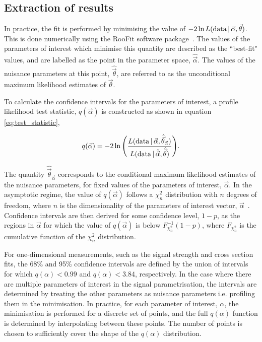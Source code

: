 \subsection{Extraction of results}\label{sec:results_extraction}
In practice, the fit is performed by minimising the value of $-2 \ln L({\rm{data}}\,|\,\vec{\alpha},\vec{\theta})$. This is done numerically using the RooFit software package~\cite{Verkerke:2003ir}. The values of the parameters of interest which minimise this quantity are described as the ``best-fit" values, and are labelled as the point in the parameter space, $\hat{\vec{\alpha}}$. The values of the nuisance parameters at this point, $\hat{\vec{\theta}}$, are referred to as the unconditional maximum likelihood estimates of $\vec{\theta}$. 

To calculate the confidence intervals for the parameters of interest, a profile likelihood test statistic, $q(\vec{\alpha})$ is constructed as shown in equation \ref{eq:test_statistic},

\begin{equation}\label{eq:test_statistic}
    q(\vec{\alpha}) = -2 \ln \Bigg( \frac{L({\rm{data}}\,|\,\vec{\alpha},\hat{\vec{\theta}}_{\vec{\alpha}})}{L({\rm{data}}\,|\,\hat{\vec{\alpha}},\hat{\vec{\theta}})} \Bigg).
\end{equation}

\noindent
The quantity $\hat{\vec{\theta}}_{\vec{\alpha}}$ corresponds to the conditional maximum likelihood estimates of the nuisance parameters, for fixed values of the parameters of interest, $\vec{\alpha}$. In the asymptotic regime,  the value of $q(\vec{\alpha})$ follows a $\chi_n^2$ distribution with $n$ degrees of freedom, where $n$ is the dimensionality of the parameters of interest vector, $\vec{\alpha}$~\cite{Cowan:2010js}. Confidence intervals are then derived for some confidence level, $1-p$, as the regions in $\vec{\alpha}$ for which the value of $q(\vec{\alpha})$ is below $F^{-1}_{\chi^2_n}(1-p)$, where $F_{\chi^2_n}$ is the cumulative function of the $\chi^2_n$ distribution.

For one-dimensional measurements, such as the signal strength and cross section fits, the 68\% and 95\% confidence intervals are defined by the union of intervals for which $q(\alpha)<0.99$ and $q(\alpha)<3.84$, respectively. In the case where there are multiple parameters of interest in the signal parametrisation, the intervals are determined by treating the other parameters as nuisance parameters i.e. profiling them in the minimisation. In practice, for each parameter of interest, $\alpha$, the minimisation is performed for a discrete set of points, and the full $q(\alpha)$ function is determined by interpolating between these points. The number of points is chosen to sufficiently cover the shape of the $q(\alpha)$ distribution.

